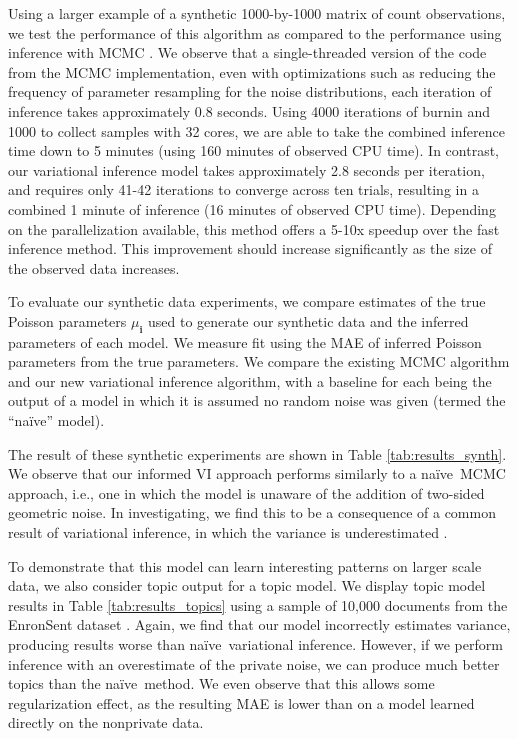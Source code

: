 \documentclass{article}
\newcommand{\subs}{\pmb{i}}
\newcommand{\mus}{\mu_{\subs}}
\newcommand{\naive}{na\"{i}ve}
\begin{document}
  Using a larger example of a synthetic 1000-by-1000 matrix of count
  observations, we test the performance of this algorithm as compared to the
  performance using inference with MCMC \citep{schein2018locally}. We observe
  that a single-threaded version of the code from the MCMC implementation, even
  with optimizations such as reducing the frequency of parameter resampling for
  the noise distributions, each iteration of inference takes approximately 0.8
  seconds. Using 4000 iterations of burnin and 1000 to collect samples with 32
  cores, we are able to take the combined inference time down to 5 minutes
  (using 160 minutes of observed CPU time). In contrast, our variational
  inference model takes approximately 2.8 seconds per iteration, and requires
  only 41-42 iterations to converge across ten trials, resulting in a combined 1
  minute of inference (16 minutes of observed CPU time). Depending on the
  parallelization available, this method offers a 5-10x speedup over the fast
  inference method. This improvement should increase significantly as the size
  of the observed data increases.


  To evaluate our synthetic data experiments, we compare estimates of the true
  Poisson parameters $\mus$ used to generate our synthetic data and the inferred
  parameters of each model. We measure fit using the MAE of inferred Poisson
  parameters from the true parameters. We compare the existing MCMC algorithm
  and our new variational inference algorithm, with a baseline for each being
  the output of a model in which it is assumed no random noise was given (termed
  the ``\naive'' model).
  
  The result of these synthetic experiments are shown in Table
  \ref{tab:results_synth}. We observe that our informed VI approach performs
  similarly to a \naive~MCMC approach, i.e., one in which the model is unaware of
  the addition of two-sided geometric noise. In investigating, we find this to
  be a consequence of a common result of variational inference, in which the
  variance is underestimated \cite{blei2017variational}.

  To demonstrate that this model can learn interesting patterns on larger scale
  data, we also consider topic output for a topic model. We display topic model
  results in Table \ref{tab:results_topics} using a sample of 10,000 documents
  from the EnronSent dataset \cite{styler2011enronsent}.
  Again, we find that our model incorrectly estimates variance, producing
  results worse than \naive~variational inference. However, if we perform
  inference with an overestimate of the private noise, we can produce much
  better topics than the \naive~method. We even observe that this allows some
  regularization effect, as the resulting MAE is lower than on a model learned
  directly on the nonprivate data.
\end{document}
